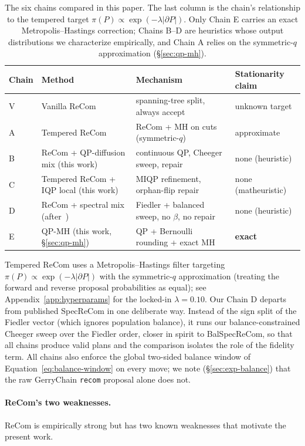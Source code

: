 \documentclass[11pt]{article}
\begin{document}
\begin{table}[H]
\centering
\small
\begin{tabular}{llll}
\toprule
Chain & Method & Mechanism & Stationarity claim \\
\midrule
V & Vanilla ReCom~\cite{deford2021recombination} & spanning-tree split, always accept & unknown target \\
A & Tempered ReCom & ReCom + MH on cuts (symmetric-$q$) & approximate \\
B & ReCom + QP-diffusion mix (this work) & continuous QP, Cheeger sweep, repair & none (heuristic) \\
C & Tempered ReCom + IQP local (this work) & MIQP refinement, orphan-flip repair & none (matheuristic) \\
D & ReCom + spectral mix (after~\cite{davies2025spectral}) & Fiedler + balanced sweep, no $\beta$, no repair & none (heuristic) \\
E & QP-MH (this work, \S\ref{sec:qp-mh}) & QP + Bernoulli rounding + exact MH & \textbf{exact} \\
\bottomrule
\end{tabular}
\caption{The six chains compared in this paper. The last column is the
  chain's relationship to the tempered target
  $\pi(P) \propto \exp(-\lambda|\partial P|)$. Only Chain E carries an
  exact Metropolis--Hastings correction; Chains B--D are heuristics
  whose output distributions we characterize empirically, and Chain A
  relies on the symmetric-$q$ approximation
  (\S\ref{sec:qp-mh}).}
\label{tab:five-chains}
\end{table}

Tempered ReCom uses a Metropolis--Hastings filter targeting
$\pi(P) \propto \exp(-\lambda |\partial P|)$ with the symmetric-$q$
approximation (treating the forward and reverse proposal probabilities
as equal); see Appendix~\ref{app:hyperparams} for the locked-in
$\lambda = 0.10$. Our Chain D departs from published SpecReCom in one
deliberate way. Instead of the sign split of the Fiedler vector (which
ignores population balance), it runs our balance-constrained Cheeger
sweep over the Fiedler order, closer in spirit to BalSpecReCom, so that all chains produce valid plans and the comparison isolates the
role of the fidelity term. All chains also enforce the global
two-sided balance window of Equation~\eqref{eq:balance-window} on
every move; we note (\S\ref{sec:exp-balance}) that the raw GerryChain
\texttt{recom} proposal alone does not.

\paragraph{ReCom's two weaknesses.}\label{sec:background-weakness}
ReCom is empirically strong but has two known weaknesses that motivate
the present work.
\end{document}
